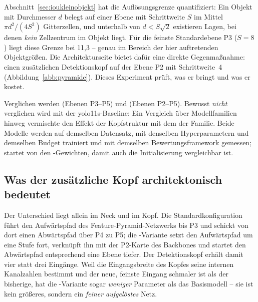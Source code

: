 Abschnitt~\ref{sec:ioukleinobjekt} hat die Auflösungsgrenze quantifiziert: Ein
Objekt mit Durchmesser $d$ belegt auf einer Ebene mit Schrittweite $S$ im Mittel
$\pi d^2/(4S^2)$ Gitterzellen, und unterhalb von $d < S\sqrt{2}$ existieren
Lagen, bei denen \emph{kein} Zellzentrum im Objekt liegt. Für die feinste
Standardebene P3 ($S = 8$) liegt diese Grenze bei 11,3\px{} -- genau im Bereich
der hier auftretenden Objektgrößen. Die Architekturseite bietet dafür eine
direkte Gegenmaßnahme: einen zusätzlichen Detektionskopf auf der Ebene P2 mit
Schrittweite~4 (Abbildung~\ref{abb:pyramide}). Dieses Experiment prüft, was er
bringt und was er kostet.

Verglichen werden  (Ebenen P3--P5) und 
(Ebenen P2--P5). Bewusst \emph{nicht} verglichen wird mit der yolo11s-Baseline:
Ein Vergleich über Modellfamilien hinweg vermischte den Effekt der Kopfstruktur
mit dem der Familie. Beide Modelle werden auf demselben Datensatz, mit denselben
Hyperparametern und demselben Budget trainiert und mit demselben
Bewertungsframework gemessen;  startet von den
-Gewichten, damit auch die Initialisierung vergleichbar ist.

\subsection{Was der zusätzliche Kopf architektonisch bedeutet}

Der Unterschied liegt allein im Neck und im Kopf. Die
Standardkonfiguration führt den Aufwärtspfad des Feature-Pyramid-Netzwerks
\parencite{lin2017fpn} bis P3 und schickt von dort einen Abwärtspfad über P4 zu
P5; die -Variante setzt den Aufwärtspfad um eine Stufe fort,
verknüpft ihn mit der P2-Karte des Backbones und startet den Abwärtspfad
entsprechend eine Ebene tiefer. Der Detektionskopf erhält damit vier statt drei
Eingänge. Weil die Eingangsbreite des Kopfes seine internen Kanalzahlen bestimmt
und der neue, feinste Eingang schmaler ist als der bisherige, hat die
-Variante sogar \emph{weniger} Parameter als das Basismodell --
sie ist kein größeres, sondern ein \emph{feiner aufgelöstes} Netz.

